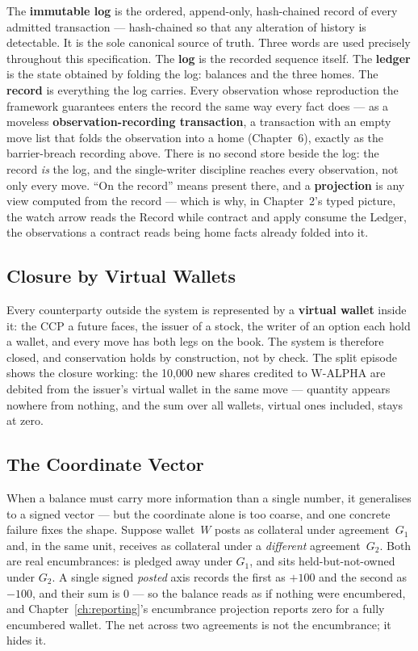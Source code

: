 The \textbf{immutable log} is the ordered, append-only, hash-chained record of every
admitted transaction --- hash-chained so that any alteration of history is detectable.
It is the sole canonical source of truth. Three words are used precisely throughout this
specification. The \textbf{log} is the recorded sequence itself. The \textbf{ledger} is
the state obtained by folding the log: balances and the three homes. The \textbf{record}
is everything the log carries. Every observation whose reproduction the framework
guarantees enters the record the same way every fact does --- as a moveless
\textbf{observation-recording transaction}, a transaction with an empty move list that
folds the observation into a home (Chapter~6), exactly as the barrier-breach recording
above. There is no second store beside the log: the record \emph{is} the log, and the
single-writer discipline reaches every observation, not only every move. ``On the
record'' means present there, and a \textbf{projection} is any view computed from the
record --- which is why, in Chapter~2's typed picture, the watch arrow reads the Record
while contract and apply consume the Ledger, the observations a contract reads being home
facts already folded into it.

\subsection{Closure by Virtual Wallets}

Every counterparty outside the system is represented by a \textbf{virtual wallet} inside
it: the CCP a future faces, the issuer of a stock, the writer of an option each hold a
wallet, and every move has both legs on the book. The system is therefore closed, and
conservation holds by construction, not by check. The split episode shows the closure
working: the 10{,}000 new shares credited to W-ALPHA are debited from the issuer's
virtual wallet in the same move --- quantity appears nowhere from nothing, and the sum
over all wallets, virtual ones included, stays at zero.

\subsection{The Coordinate Vector}\label{sec:coordinate-vector}

When a balance must carry more information than a single number, it generalises to a
signed vector --- but the coordinate alone is too coarse, and one concrete failure fixes
the shape. Suppose wallet~$W$ posts  as collateral under agreement~$G_1$ and,
in the same unit, receives  as collateral under a \emph{different}
agreement~$G_2$. Both are real encumbrances:  is pledged away under $G_1$, and
 sits held-but-not-owned under $G_2$. A single signed \emph{posted} axis records
the first as $+100$ and the second as $-100$, and their sum is $0$ --- so the balance reads
as if nothing were encumbered, and Chapter~\ref{ch:reporting}'s encumbrance projection
reports zero for a fully encumbered wallet. The net across two agreements is not the
encumbrance; it hides it.

